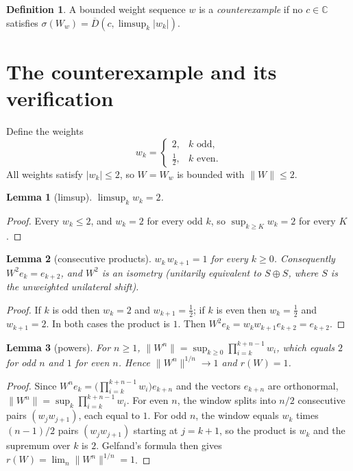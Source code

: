 \documentclass[11pt]{article}
\newtheorem{lemma}{Lemma}
\theoremstyle{definition}
\newtheorem{definition}{Definition}
\begin{document}
\begin{definition}
A bounded weight sequence $w$ is a \emph{counterexample} if no $c\in\mathbb{C}$ satisfies
$\sigma(W_w)=\overline{D}(c,\limsup_k|w_k|)$.
\end{definition}

\section{The counterexample and its verification}

Define the weights
\[
w_k=\begin{cases} 2, & k \text{ odd},\\ \tfrac12, & k \text{ even}.\end{cases}
\]
All weights satisfy $|w_k|\le 2$, so $W=W_w$ is bounded with $\|W\|\le 2$.

\begin{lemma}[limsup]
$\limsup_k w_k=2$.
\end{lemma}
\begin{proof}
Every $w_k\le 2$, and $w_k=2$ for every odd $k$, so $\sup_{k\ge K}w_k=2$ for every $K$.
\end{proof}

\begin{lemma}[consecutive products]
$w_k\,w_{k+1}=1$ for every $k\ge 0$. Consequently $W^2e_k=e_{k+2}$, and $W^2$ is an isometry
(unitarily equivalent to $S\oplus S$, where $S$ is the unweighted unilateral shift).
\end{lemma}
\begin{proof}
If $k$ is odd then $w_k=2$ and $w_{k+1}=\tfrac12$; if $k$ is even then $w_k=\tfrac12$ and $w_{k+1}=2$.
In both cases the product is $1$. Then $W^2 e_k=w_k w_{k+1}e_{k+2}=e_{k+2}$.
\end{proof}

\begin{lemma}[powers]
For $n\ge 1$, $\|W^n\|=\sup_{k\ge 0}\prod_{i=k}^{k+n-1}w_i$, which equals $2$ for odd $n$ and $1$ for even $n$.
Hence $\|W^n\|^{1/n}\to 1$ and $r(W)=1$.
\end{lemma}
\begin{proof}
Since $W^ne_k=\big(\prod_{i=k}^{k+n-1}w_i\big)e_{k+n}$ and the vectors $e_{k+n}$ are orthonormal,
$\|W^n\|=\sup_k\prod_{i=k}^{k+n-1}w_i$. For even $n$, the window splits into $n/2$ consecutive pairs
$(w_j w_{j+1})$, each equal to $1$. For odd $n$, the window equals $w_k$ times $(n-1)/2$ pairs
$(w_{j}w_{j+1})$ starting at $j=k+1$, so the product is $w_k$ and the supremum over $k$ is $2$.
Gelfand's formula then gives $r(W)=\lim_n\|W^n\|^{1/n}=1$.
\end{proof}
\end{document}

